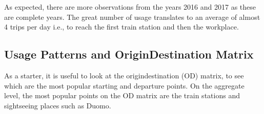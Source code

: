 \documentclass[letterpaper,10pt,english]{jupyterBook}
\begin{document}
\sphinxAtStartPar
As expected, there are more observations from the years 2016 and 2017 as these are complete years. The great number of usage translates to an average of almost 4 trips per day \sphinxhyphen{} i.e., to reach the first train station and then the workplace.


\subsection{Usage Patterns and Origin\sphinxhyphen{}Destination Matrix}
\label{\detokenize{03-data_ingestion_and_spatial_operations:usage-patterns-and-origin-destination-matrix}}
\sphinxAtStartPar
As a starter, it is useful to look at the origin\sphinxhyphen{}destination (OD) matrix, to see which are the most popular starting and departure points. On the aggregate level, the most popular points on the OD matrix are the train stations and sightseeing places such as Duomo.
\end{document}
